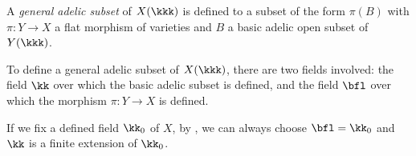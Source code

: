 

    \begin{definition}\label{def:general_adelic_subset}
        A \emph{general adelic subset} of \(X(\kkk)\) is defined to a subset of the form \(\pi(B)\) with \(\pi: Y \to X\) a flat morphism of varieties and \(B\) a basic adelic open subset of \(Y(\kkk)\). 
    \end{definition}

    \begin{remark}\label{rmk:general_adelic_subset_and_define_field}
        To define a general adelic subset of \(X(\kkk)\), there are two fields involved: the field \(\kk\) over which the basic adelic subset is defined, 
        and the field \(\bfl\) over which the morphism \(\pi:Y \to X\) is defined. 

        If we fix a defined field \(\kk_0\) of \(X\), by \cite[Proposition 3.15 (ii) and (v)]{Xie25ZDOsurfaces}, we can always choose \(\bfl = \kk_0\) and \(\kk\) is a finite extension of \(\kk_0\). 
    \end{remark}


